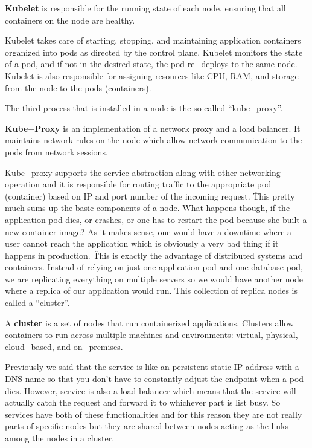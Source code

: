 \bd[Kubelet]
\textbf{Kubelet} is responsible for the running state of each node, ensuring that all containers on the node are
healthy.
\ed

Kubelet takes care of starting, stopping, and maintaining application containers organized into pods as directed by
the control plane. Kubelet monitors the state of a pod, and if not in the desired state, the pod re$-$deploys to the
same node. Kubelet is also responsible for assigning resources like CPU, RAM, and storage from the node to the pods
(containers).


The third process that is installed in a node is the so called ``kube$-$proxy''.

\textbf{Kube$-$Proxy} is an implementation of a network proxy and a load balancer. It maintains network rules on the
node which allow network communication to the pods from network sessions.
\ed


Kube$-$proxy supports the service abstraction along with other networking operation and it is responsible for routing
traffic to the appropriate pod (container) based on IP and port number of the incoming request. \v

This pretty much sums up the basic components of a node. What happens though, if the application pod dies, or
crashes, or one has to restart the pod because she built a new container image? As it makes sense, one would have a
downtime where a user cannot reach the application which is obviously a very bad thing if it happens in production. \v

This is exactly the advantage of distributed systems and containers. Instead of relying on just one application pod
and one database pod, we are replicating everything on multiple servers so we would have another node where a replica
of our application would run. This collection of replica nodes is called a ``cluster''.

\bd[Cluster]
A \textbf{cluster} is a set of nodes that run containerized applications. Clusters allow containers to run across
multiple machines and environments: virtual, physical, cloud$-$based, and on$-$premises.
\ed

Previously we said that the service is like an persistent static IP address with a DNS name so that you don't have to
constantly adjust the endpoint when a pod dies. However, service is also a load balancer which means that the service
will actually catch the request and forward it to whichever part is list busy. So services have both of these
functionalities and for this reason they are not really parts of specific nodes but they are shared between nodes
acting as the links among the nodes in a cluster.

